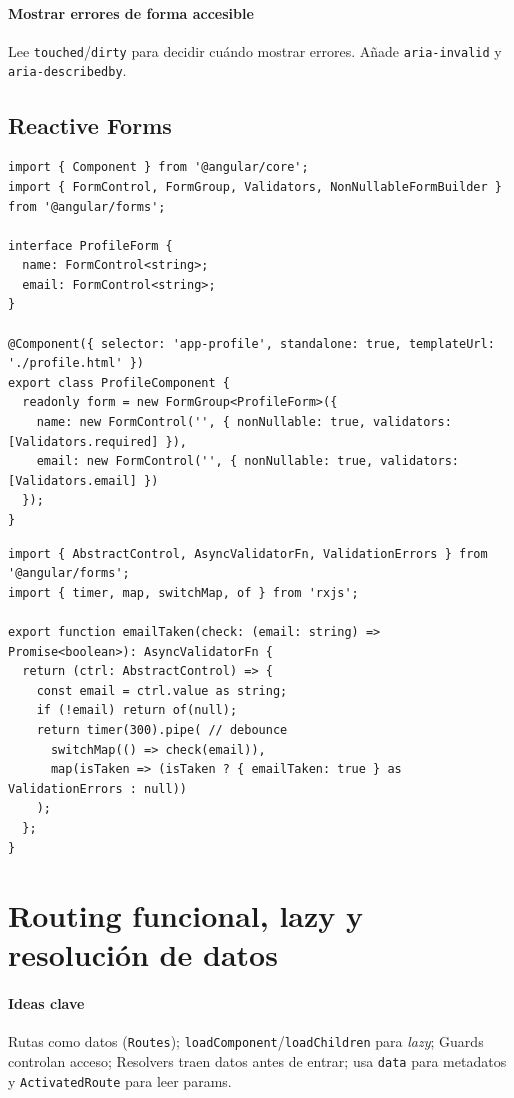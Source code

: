 \documentclass[11pt,a4paper]{article}
\begin{document}
\paragraph{Mostrar errores de forma accesible}
Lee \texttt{touched}/\texttt{dirty} para decidir cuándo mostrar errores. Añade \texttt{aria-invalid} y \texttt{aria-describedby}.

\subsection{Reactive Forms}
\begin{lstlisting}[style=tsstyle, caption={FormGroup tipado y validadores personalizados}]
import { Component } from '@angular/core';
import { FormControl, FormGroup, Validators, NonNullableFormBuilder } from '@angular/forms';

interface ProfileForm {
  name: FormControl<string>;
  email: FormControl<string>;
}

@Component({ selector: 'app-profile', standalone: true, templateUrl: './profile.html' })
export class ProfileComponent {
  readonly form = new FormGroup<ProfileForm>({
    name: new FormControl('', { nonNullable: true, validators: [Validators.required] }),
    email: new FormControl('', { nonNullable: true, validators: [Validators.email] })
  });
}
\end{lstlisting}

\begin{lstlisting}[style=tsstyle, caption={Validador asíncrono con cache y cancelación}]
import { AbstractControl, AsyncValidatorFn, ValidationErrors } from '@angular/forms';
import { timer, map, switchMap, of } from 'rxjs';

export function emailTaken(check: (email: string) => Promise<boolean>): AsyncValidatorFn {
  return (ctrl: AbstractControl) => {
    const email = ctrl.value as string;
    if (!email) return of(null);
    return timer(300).pipe( // debounce
      switchMap(() => check(email)),
      map(isTaken => (isTaken ? { emailTaken: true } as ValidationErrors : null))
    );
  };
}
\end{lstlisting}

\section{Routing funcional, lazy y resolución de datos}
\paragraph{Ideas clave}
Rutas como datos (\texttt{Routes}); \texttt{loadComponent}/\texttt{loadChildren} para \emph{lazy}; Guards controlan acceso; Resolvers traen datos antes de entrar; usa \texttt{data} para metadatos y \texttt{ActivatedRoute} para leer params.
\end{document}
